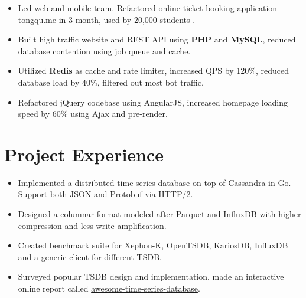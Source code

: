 \documentclass[11pt, letterpaper]{simple-cv}
\begin{document}
\begin{itemize}
  \item Led web and mobile team. Refactored online ticket booking application \href{https://tongqu.me}{tongqu.me} in 3 month, used by 20,000 students .
  \item Built high traffic website and REST API using \textbf{PHP} and \textbf{MySQL}, reduced database contention using job queue and cache.
  \item Utilized \textbf{Redis} as cache and rate limiter, increased QPS by 120\%, reduced database load by 40\%, filtered out most bot traffic.
  \item Refactored jQuery codebase using AngularJS, increased homepage loading speed by 60\% using Ajax and pre-render.
\end{itemize}

\section{Project Experience}



\begin{itemize}
  \item Implemented a distributed time series database on top of Cassandra in Go. Support both JSON and Protobuf via HTTP/2.
  \item Designed a columnar format modeled after Parquet and InfluxDB with higher compression and less write amplification.
  \item Created benchmark suite for Xephon-K, OpenTSDB, KariosDB, InfluxDB and a generic client for different TSDB.
  \item Surveyed popular TSDB design and implementation, made an interactive online report called \href{https://xephonhq.github.io/awesome-time-series-database}{awesome-time-series-database}.
\end{itemize}

\end{document}

